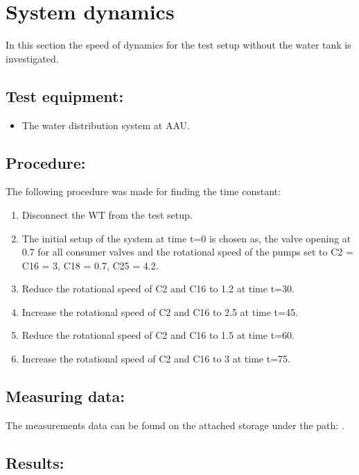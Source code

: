 \section{System dynamics}
\label{sec:pipe_dynamics}

In this section the speed of dynamics for the test setup without the water tank is investigated.

\subsection*{Test equipment:}
\begin{itemize}
\item The water distribution system at AAU.
\end{itemize}

\subsection*{Procedure:}
The following procedure was made for finding the time constant:
\begin{enumerate}
\item Disconnect the WT from the test setup.  
\item The initial setup of the system at time t=0 is chosen as, the valve opening at 0.7 for all consumer valves and the rotational speed of the pumps set to C2 = C16 = 3, C18 = 0.7, C25 = 4.2.
\item Reduce the rotational speed of C2 and C16 to 1.2 at time t=30.
\item Increase the rotational speed of C2 and C16 to 2.5 at time t=45.
\item Reduce the rotational speed of C2 and C16 to 1.5 at time t=60.
\item Increase the rotational speed of C2 and C16 to 3 at time t=75.
\end{enumerate}

\subsection*{Measuring data:}
The measurements data can be found on the attached storage under the path: .

\subsection*{Results:}

